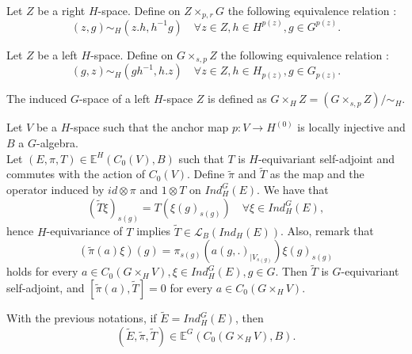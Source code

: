 Let $Z$ be a right $H$-space. Define on $Z\times_{p,r} G$ the following equivalence relation :
\[(z,g)\sim_H (z.h, h^{-1}g)\quad \forall z\in Z, h\in H^{p(z)},g\in G^{p(z)}.\]

Let $Z$ be a left $H$-space. Define on $G \times_{s,p} Z $ the following equivalence relation :
\[(g,z)\sim_H (gh^{-1}, h.z)\quad \forall z\in Z, h\in H_{p(z)},g\in G_{p(z)}.\]

\begin{definition}
The induced $G$-space of a left $H$-space $Z$ is defined as $ G\times_H Z = (G \times_{s,p} Z) / \sim_H$. 
\end{definition}


Let $V$ be a $H$-space such that the anchor map $p : V\rightarrow H^{(0)}$ is locally injective and $B$ a $G$-algebra. \\

Let $(E,\pi,T)\in \mathbb E^H(C_0(V),B)$ such that $T$ is $H$-equivariant self-adjoint and commutes with the action of $C_0(V)$. Define $\tilde\pi$ and $\tilde T$ as the map and the operator induced by $id\otimes \pi$ and $1\otimes T$ on $Ind_H^G (E)$. We have that 
\[(\tilde T\xi)_{s(g)} = T(\xi(g)_{s(g)})\quad \forall \xi \in Ind_H^G(E),  \]
hence $H$-equivariance of $T$ implies $\tilde T\in\mathcal L_B(Ind_H (E))$. Also, remark that 
\[(\tilde \pi(a)\xi)(g) =\pi_{s(g)} (a(g,.)_{|V_{s(g)}} ) \xi (g)_{s(g)}\]
holds for every $a\in C_0(G\times_H V),\xi \in Ind_H^G(E), g\in G$. Then $\tilde T$ is $G$-equivariant self-adjoint, and $[\tilde \pi(a),\tilde T]=0$ for every $a\in C_0(G\times_H V)$.

\begin{lem}
With the previous notations, if $\tilde E= Ind_H^G (E)$, then 
\[(\tilde E, \tilde \pi, \tilde T)\in \mathbb E^G(C_0(G\times_H V),B).\] %
\end{lem}

